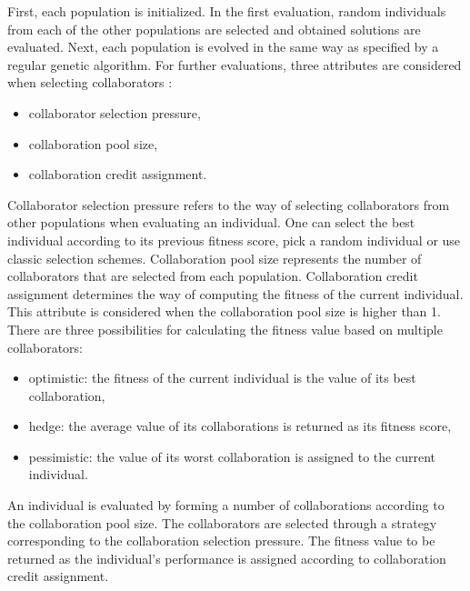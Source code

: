First, each population is initialized.
In the first evaluation, random individuals from each of the other populations are selected and obtained solutions are evaluated. 
Next, each population is evolved in the same way as specified by a regular genetic algorithm.
For further evaluations, three attributes are considered when selecting collaborators 
\cite{stoean2014support}:
\begin{itemize}
	\item collaborator selection pressure, 
	\item collaboration pool size,
	\item collaboration credit assignment.
\end{itemize}
Collaborator selection pressure refers to the way of selecting collaborators from other populations when evaluating an individual. 
One can select the best individual according to its previous fitness score, pick a random individual or use classic selection schemes. 
Collaboration pool size represents the number of collaborators that are selected from each population. 
Collaboration credit assignment determines the way of computing the fitness of the current individual. This attribute is considered when the collaboration pool size is higher than 1. 
There are three possibilities for calculating the fitness value based on multiple collaborators:
\begin{itemize}
	\item optimistic: the fitness of the current individual is the value of its best collaboration,
	\item hedge: the average value of its collaborations is returned as its fitness score,
	\item pessimistic: the value of its worst collaboration is assigned to the current individual. 
\end{itemize}
An individual is evaluated by forming a number of collaborations according to the collaboration pool size. The collaborators are selected through a strategy corresponding to the collaboration selection pressure. 
The fitness value to be returned as the individual's performance is assigned according to collaboration credit assignment. 

